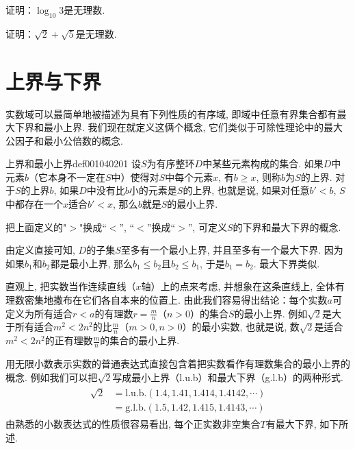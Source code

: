 \begin{problem}
证明：$\log_{10}{3}$是无理数. 
\end{problem}

\begin{problem}
证明：$\sqrt{2} + \sqrt{5}$是无理数. 
\end{problem}



\section{上界与下界}\label{subsection0010402}
实数域可以最简单地被描述为具有下列性质的有序域, 即域中任意有界集合都有最大下界和最小上界. 我们现在就定义这俩个概念, 它们类似于可除性理论中的最大公因子和最小公倍数的概念. 

\begin{definition}{上界和最小上界}{def001040201}
设$S$为有序整环$D$中某些元素构成的集合. 如果$D$中元素$b$（它本身不一定在$S$中）使得对$S$中每个元素$x$, 有$b \ge x$, 则称$b$为$S$的上界. 对于$S$的上界$b$, 如果$D$中没有比$b$小的元素是$S$的上界, 也就是说, 如果对任意$b' < b$, $S$中都存在一个$x$适合$b'<x$, 那么$b$就是$S$的最小上界. 
\end{definition}

把上面定义的"$>$"换成“$<$”, “$<$”换成“$>$”, 可定义$S$的下界和最大下界的概念. 

由定义直接可知, $D$的子集$S$至多有一个最小上界, 并且至多有一个最大下界. 因为如果$b_1$和$b_2$都是最小上界, 那么$b_1 \le b_2$且$b_2 \le b_1$, 于是$b_1=b_2$. 最大下界类似. 

直观上, 把实数当作连续直线（$x$轴）上的点来考虑, 并想象在这条直线上, 全体有理数密集地撒布在它们各自本来的位置上. 由此我们容易得出结论：每个实数$a$可定义为所有适合$r < a$的有理数$r = \frac{m}{n}$（$n > 0$）的集合$S$的最小上界. 例如$\sqrt{2}$是大于所有适合$m^2 < 2n^2$的比$\frac{m}{n}$（$m > 0, n > 0$）的最小实数, 也就是说, 数$\sqrt{2}$是适合$m^2<2n^2$的正有理数$\frac{m}{n}$的集合的最小上界. 

用无限小数表示实数的普通表达式直接包含着把实数看作有理数集合的最小上界的概念. 例如我们可以把$\sqrt{2}$写成最小上界（l.u.b）和最大下界（g.l.b）的两种形式. 
\begin{gather}\label{equ001040204}
\begin{aligned}
\sqrt{2} &= \text{l.u.b.}(1.4,1.41,1.414,1.4142,\cdots)\\
&=\text{g.l.b.}(1.5, 1.42, 1.415, 1.4143,\cdots)
\end{aligned}
\end{gather}
由熟悉的小数表达式的性质很容易看出, 每个正实数非空集合$T$有最大下界, 如下所述. 


